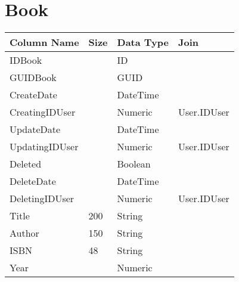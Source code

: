 \section{Book}
\begin{small}
\begin{tabular}{ p{5cm} p{1cm} p{3cm}  p{3.75cm} }
\textbf{Column Name} & \textbf{Size} & \textbf{Data Type} & \textbf{Join} \\ \hline 
IDBook &  & ID &  \\ 
GUIDBook &  & GUID &  \\ 
CreateDate &  & DateTime &  \\ 
CreatingIDUser &  & Numeric & User.IDUser \\ 
UpdateDate &  & DateTime &  \\ 
UpdatingIDUser &  & Numeric & User.IDUser \\ 
Deleted &  & Boolean &  \\ 
DeleteDate &  & DateTime &  \\ 
DeletingIDUser &  & Numeric & User.IDUser \\ 
Title & 200 & String &  \\ 
Author & 150 & String &  \\ 
ISBN & 48 & String &  \\ 
Year &  & Numeric &  \\ 
\end{tabular}
\end{small}
